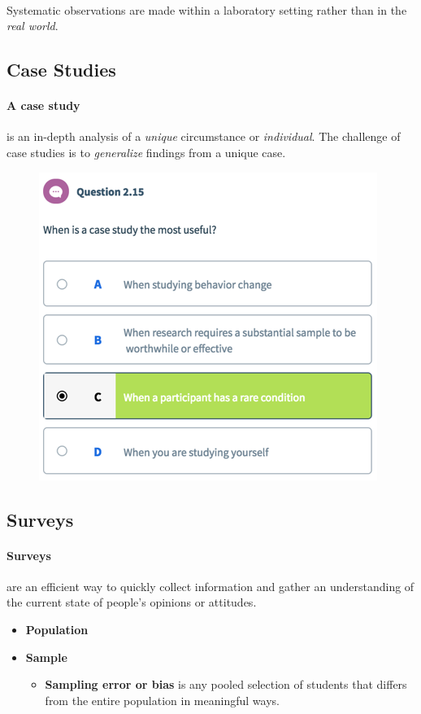 \documentclass{article}
\begin{document}
 	\paragraph{}Systematic observations are made within a laboratory setting rather than in the \emph{real world}.
 	\subsection{Case Studies}
 	\paragraph{A case study} is an in-depth analysis of a \emph{unique} circumstance or \emph{individual}.
 	\newline The challenge of case studies is to \emph{generalize} findings from a unique case.
  	\begin{figure}[H]
 		\centering
 		\includegraphics{psy100/0215}	
 	\end{figure}
 	\subsection{Surveys}
 	\paragraph{Surveys} are an efficient way to quickly collect information and gather an understanding of the current state of people's opinions or attitudes.
 	\begin{itemize}
 		\item \textbf{Population}
 		\item \textbf{Sample}
 		\begin{itemize}
 			\item \textbf{Sampling error or bias} is any pooled selection of students that differs from the entire population in meaningful ways.
 		\end{itemize}
 	\end{itemize}
\end{document}
